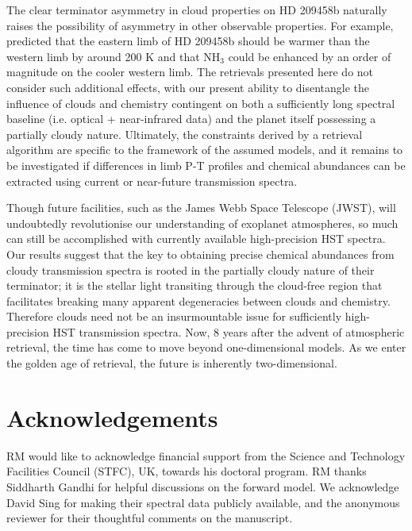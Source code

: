 \documentclass[fleqn,usenatbib]{mnras}
\begin{document}
The clear terminator asymmetry in cloud properties on HD 209458b naturally raises the possibility of asymmetry in other observable properties. For example, \citet{Kataria2016} predicted that the eastern limb of HD 209458b should be warmer than the western limb by around 200 K and that NH$_3$ could be enhanced by an order of magnitude on the cooler western limb. The retrievals presented here do not consider such additional effects, with our present ability to disentangle the influence of clouds and chemistry contingent on both a sufficiently long spectral baseline (i.e. optical + near-infrared data) and the planet itself possessing a partially cloudy nature. Ultimately, the constraints derived by a retrieval algorithm are specific to the framework of the assumed models, and it remains to be investigated if differences in limb P-T profiles and chemical abundances can be extracted using current or near-future transmission spectra.

Though future facilities, such as the James Webb Space Telescope (JWST), will undoubtedly revolutionise our understanding of exoplanet atmospheres, so much can still be accomplished with currently available high-precision HST spectra. Our results suggest that the key to obtaining precise chemical abundances from cloudy transmission spectra is rooted in the partially cloudy nature of their terminator; it is the stellar light transiting through the cloud-free region that facilitates breaking many apparent degeneracies between clouds and chemistry. Therefore clouds need not be an insurmountable issue for sufficiently high-precision HST transmission spectra. Now, 8 years after the advent of atmospheric retrieval, the time has come to move beyond one-dimensional models. As we enter the golden age of retrieval, the future is inherently two-dimensional.

\section*{Acknowledgements}

RM would like to acknowledge financial support from the Science and Technology Facilities Council (STFC), UK, towards his doctoral program. RM thanks Siddharth Gandhi for helpful discussions on the forward model. We acknowledge David Sing for making their spectral data publicly available, and the anonymous reviewer for their thoughtful comments on the manuscript.


 
\end{document}
